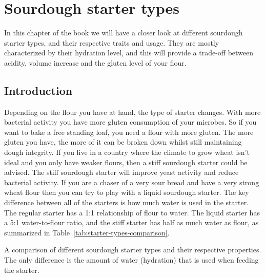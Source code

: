 \chapter{Sourdough starter types}%
\label{ch:starter-types}
\begin{quoting}
In this chapter of the book we will have a closer look
at different sourdough starter types, and their respective
traits and usage. They are mostly characterized by their hydration
level, and this will provide a trade-off between acidity, volume increase and
the gluten level of your flour.
\end{quoting}

\section{Introduction}%
\label{sec:starter-types-intro}

Depending on the flour you have at hand, the type of starter changes. With more
bacterial activity you have more gluten consumption of your microbes. So if
you want to bake a free standing loaf, you need a flour with more gluten. The
more gluten you have, the more of it can be broken down whilst still maintaining
dough integrity. If you live in a country where the climate to grow wheat
isn't ideal and you only have weaker flours, then a stiff sourdough starter
could be advised. The stiff sourdough starter will improve yeast activity and
reduce bacterial activity. If you are a chaser of a very sour bread and have a
very strong wheat flour then you can try to play with a liquid sourdough
starter. The key difference between all of the starters is how much water
is used in the starter. The regular starter has a 1:1 relationship of flour
to water. The liquid starter has a 5:1 water-to-flour ratio, and the stiff
starter has half as much water as flour, as summarized in
Table~\ref{tab:starter-types-comparison}.

\begin{table}[htp!]
    \begin{center}
        
        \caption[Different types of sourdough]{A comparison of different
            sourdough starter types and their respective properties. The only
            difference is the amount of water (hydration) that is used when
            feeding the starter.}%
        \label{tab:starter-types-comparison}
    \end{center}
\end{table}

